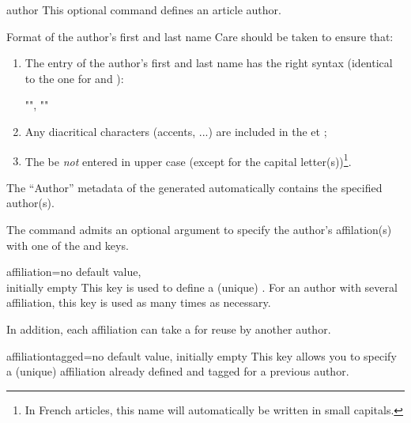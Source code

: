 \documentclass[english,nolocaltoc]{nwejmart}
\newtheorem[style=definition]{fact}
\newtheorem[title=experience]{experience}
\newtheorem[title-plural=rings]{ring}
\newtheorem[title=ideal,title-plural=ideals]{ideal}
\begin{document}
\begin{docCommand}{author}{}
  This optional command defines an article author.
\end{docCommand}
%
\begin{dbwarning}{Format of the author's first and last name}{}
  Care should be taken to ensure that:
  \begin{enumerate}
  \item The entry of the author's first and last name has the right syntax (identical to the one for  and ):
\begin{bodycode}[listing options={showspaces}]
"", ""
\end{bodycode}
  \item Any diacritical characters (accents, ...) are included in the  et  ;
  \item The  be \emph{not} entered in upper case (except for the capital letter(s))\footnote{In French articles, this name will automatically be written in small capitals.}.
  \end{enumerate}

 The \enquote{Author} metadata of the generated  automatically contains the specified author(s).
\end{dbwarning}

The  command admits an optional argument to specify the
author's affilation(s) with one of  the 
and  keys.

\begin{docKey}{affiliation}{={}}{no
    default value,\\initially empty}
  This key is used to define a  (unique) . For an
  author with several affiliation, this key is used as many times as necessary.

  In addition, each affiliation can take a  for reuse by
  another author.
\end{docKey}

\begin{docKey}{affiliationtagged}{={}}{no
    default value, initially empty}
  This key allows you to specify a (unique) affiliation already
  defined and tagged for a previous author.
\end{docKey}

\end{document}
